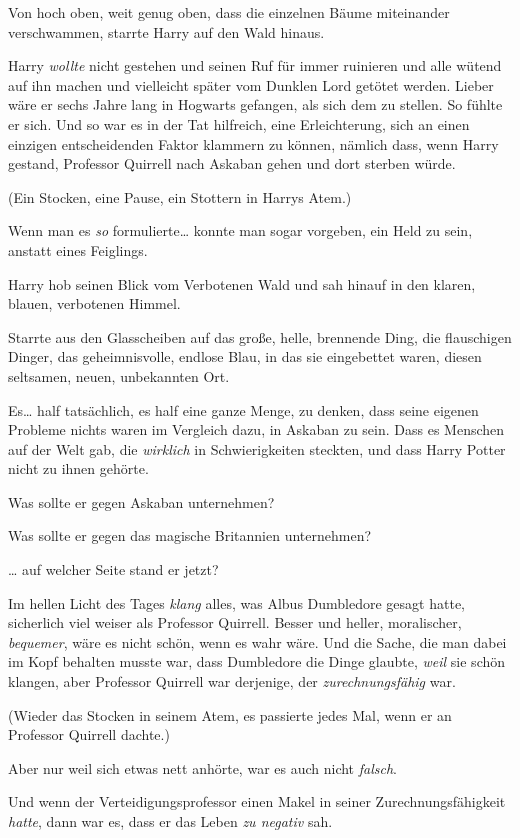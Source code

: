 {Von hoch oben, weit genug oben, dass die einzelnen Bäume miteinander verschwammen, starrte Harry auf den Wald hinaus.

Harry \emph{wollte} nicht gestehen und seinen Ruf für immer ruinieren und alle wütend auf ihn machen und vielleicht später vom Dunklen Lord getötet werden. Lieber wäre er sechs Jahre lang in Hogwarts gefangen, als sich dem zu stellen. So fühlte er sich. Und so war es in der Tat hilfreich, eine Erleichterung, sich an einen einzigen entscheidenden Faktor klammern zu können, nämlich dass, wenn Harry gestand, Professor Quirrell nach Askaban gehen und dort sterben würde.

(Ein Stocken, eine Pause, ein Stottern in Harrys Atem.)

Wenn man es \emph{so} formulierte… konnte man sogar vorgeben, ein Held zu sein, anstatt eines Feiglings.

Harry hob seinen Blick vom Verbotenen Wald und sah hinauf in den klaren, blauen, verbotenen Himmel.

Starrte aus den Glasscheiben auf das große, helle, brennende Ding, die flauschigen Dinger, das geheimnisvolle, endlose Blau, in das sie eingebettet waren, diesen seltsamen, neuen, unbekannten Ort.

Es… half tatsächlich, es half eine ganze Menge, zu denken, dass seine eigenen Probleme nichts waren im Vergleich dazu, in Askaban zu sein. Dass es Menschen auf der Welt gab, die \emph{wirklich} in Schwierigkeiten steckten, und dass Harry Potter nicht zu ihnen gehörte.

Was sollte er gegen Askaban unternehmen?

Was sollte er gegen das magische Britannien unternehmen?

… auf welcher Seite stand er jetzt?

Im hellen Licht des Tages \emph{klang} alles, was Albus Dumbledore gesagt hatte, sicherlich viel weiser als Professor Quirrell. Besser und heller, moralischer, \emph{bequemer}, wäre es nicht schön, wenn es wahr wäre. Und die Sache, die man dabei im Kopf behalten musste war, dass Dumbledore die Dinge glaubte, \emph{weil} sie schön klangen, aber Professor Quirrell war derjenige, der \emph{zurechnungsfähig} war.

(Wieder das Stocken in seinem Atem, es passierte jedes Mal, wenn er an Professor Quirrell dachte.)

Aber nur weil sich etwas nett anhörte, war es auch nicht \emph{falsch}.

Und wenn der Verteidigungsprofessor einen Makel in seiner Zurechnungsfähigkeit \emph{hatte}, dann war es, dass er das Leben \emph{zu negativ} sah.

}
